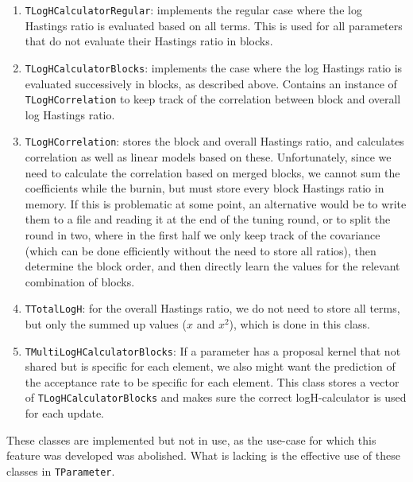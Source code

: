 \documentclass[a4paper,11pt]{article}
\newcommand{\class}[1]{\texttt{#1}}
\begin{document}
\begin{enumerate}
 \item \class{TLogHCalculatorRegular}: implements the regular case where the log Hastings ratio is evaluated based on all terms. This is used for all parameters that do not evaluate their Hastings ratio in blocks.
 \item \class{TLogHCalculatorBlocks}: implements the case where the log Hastings ratio is evaluated successively in blocks, as described above. Contains an instance of \class{TLogHCorrelation} to keep track of the correlation between block and overall log Hastings ratio.
 \item \class{TLogHCorrelation}: stores the block and overall Hastings ratio, and calculates correlation as well as linear models based on these. Unfortunately, since we need to calculate the correlation based on merged blocks, we cannot sum the coefficients while the burnin, but must store every block Hastings ratio in memory. If this is problematic at some point, an alternative would be to write them to a file and reading it at the end of the tuning round, or to split the round in two, where in the first half we only keep track of the covariance (which can be done efficiently without the need to store all ratios), then determine the block order, and then directly learn the values for the relevant combination of blocks.
 \item \class{TTotalLogH}: for the overall Hastings ratio, we do not need to store all terms, but only the summed up values ($x$ and $x^2$), which is done in this class.
 \item \class{TMultiLogHCalculatorBlocks}: If a parameter has a proposal kernel that not shared but is specific for each element, we also might want the prediction of the acceptance rate to be specific for each element. This class stores a vector of \class{TLogHCalculatorBlocks} and makes sure the correct logH-calculator is used for each update.
\end{enumerate}

These classes are implemented but not in use, as the use-case for which this feature was developed was abolished. What is lacking is the effective use of these classes in
\class{TParameter}.
\end{document}
